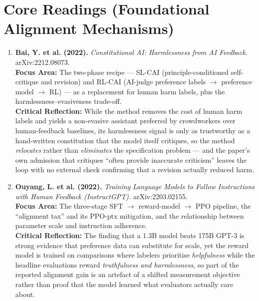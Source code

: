\documentclass[10pt,a4paper]{article}
\begin{document}
\section{Core Readings (Foundational Alignment Mechanisms)}
\begin{enumerate}[leftmargin=1.4em, itemsep=7pt, topsep=3pt]
  \item \textbf{Bai, Y. et al. (2022).} \textit{Constitutional AI: Harmlessness from AI Feedback.} arXiv:2212.08073.\\
  \textbf{Focus Area:} The two-phase recipe --- SL-CAI (principle-conditioned self-critique and revision) and RL-CAI (AI-judge preference labels $\to$ preference model $\to$ RL) --- as a replacement for human harm labels, plus the harmlessness--evasiveness trade-off.\\
  \textcolor{critiquecolor}{\textbf{Critical Reflection:}} While the method removes the cost of human harm labels and yields a non-evasive assistant preferred by crowdworkers over human-feedback baselines, its harmlessness signal is only as trustworthy as a hand-written constitution that the model itself critiques, so the method \emph{relocates} rather than \emph{eliminates} the specification problem --- and the paper's own admission that critiques ``often provide inaccurate criticism'' leaves the loop with no external check confirming that a revision actually reduced harm.

  \item \textbf{Ouyang, L. et al. (2022).} \textit{Training Language Models to Follow Instructions with Human Feedback (InstructGPT).} arXiv:2203.02155.\\
  \textbf{Focus Area:} The three-stage SFT $\to$ reward-model $\to$ PPO pipeline, the ``alignment tax'' and its PPO-ptx mitigation, and the relationship between parameter scale and instruction adherence.\\
  \textcolor{critiquecolor}{\textbf{Critical Reflection:}} The finding that a 1.3B model beats 175B GPT-3 is strong evidence that preference data can substitute for scale, yet the reward model is trained on comparisons where labelers prioritise \emph{helpfulness} while the headline evaluations reward \emph{truthfulness and harmlessness}, so part of the reported alignment gain is an artefact of a shifted measurement objective rather than proof that the model learned what evaluators actually care about.
\end{enumerate}
\end{document}
